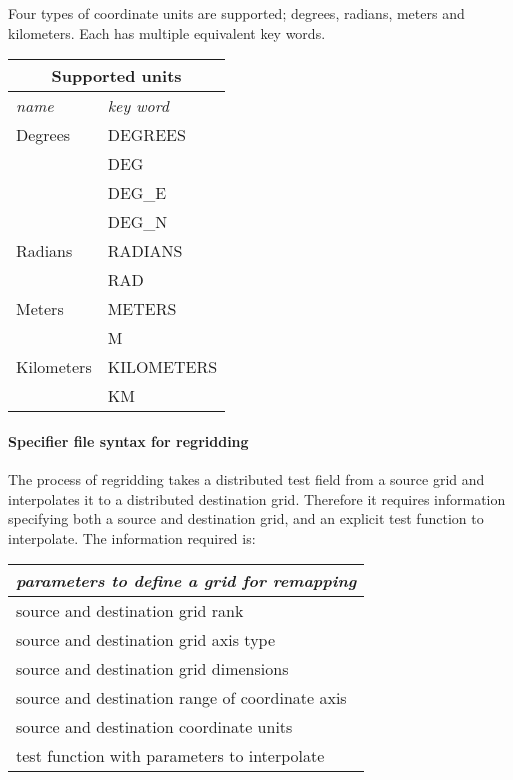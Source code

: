 Four types of coordinate units are supported; degrees, radians, meters and kilometers.  Each has multiple equivalent key words. 
 \begin{center}
\begin{tabular}{| l | l |} 
\multicolumn{2}{c}{ Supported units }  \\
\hline 
{\em name } & {\em key word} \\
\hline \hline
Degrees & DEGREES \\
  & DEG \\
  & DEG\_E \\
  & DEG\_N \\
  \hline
Radians & RADIANS \\
  & RAD \\
  \hline
 Meters & METERS \\
    & M \\
    \hline
   Kilometers & KILOMETERS \\
      & KM \\
\hline 
\end{tabular}
\end{center}


\paragraph{Specifier file syntax for regridding}
The process of regridding takes a distributed test field from a source grid and interpolates it to a distributed destination grid. Therefore it requires information specifying both a source and destination grid, and an explicit test function to interpolate. The information required is:
\begin{center}
\begin{tabular}{| l |} \hline 
{\em parameters to define a grid for remapping }  \\
\hline \hline
 source and destination grid rank    \\
 source and destination grid axis type   \\
 source and destination grid dimensions   \\
 source and destination range of coordinate axis  \\
 source and destination coordinate units \\
 test function with parameters to interpolate \\
\hline 
\end{tabular}
\end{center}

